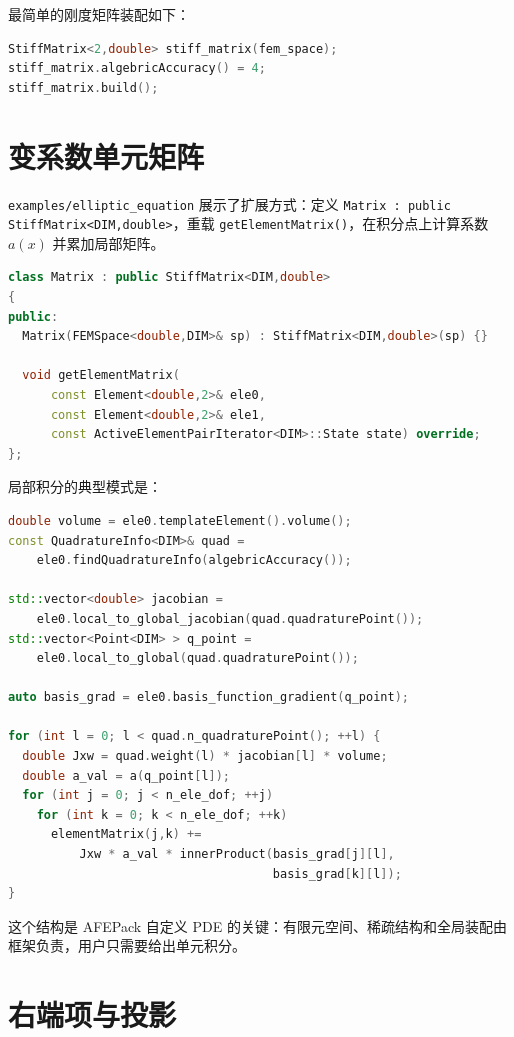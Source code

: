 \documentclass[UTF8,openany,zihao=-4,scheme=chinese]{ctexbook}
\newcommand{\file}[1]{\nolinkurl{#1}}
\newcommand{\class}[1]{\texttt{#1}}
\begin{document}
最简单的刚度矩阵装配如下：

\begin{lstlisting}[language=C++]
StiffMatrix<2,double> stiff_matrix(fem_space);
stiff_matrix.algebricAccuracy() = 4;
stiff_matrix.build();
\end{lstlisting}

\section{变系数单元矩阵}

\file{examples/elliptic_equation} 展示了扩展方式：定义 \class{Matrix : public StiffMatrix<DIM,double>}，重载 \class{getElementMatrix()}，在积分点上计算系数 $a(x)$ 并累加局部矩阵。

\begin{lstlisting}[language=C++]
class Matrix : public StiffMatrix<DIM,double>
{
public:
  Matrix(FEMSpace<double,DIM>& sp) : StiffMatrix<DIM,double>(sp) {}

  void getElementMatrix(
      const Element<double,2>& ele0,
      const Element<double,2>& ele1,
      const ActiveElementPairIterator<DIM>::State state) override;
};
\end{lstlisting}

局部积分的典型模式是：

\begin{lstlisting}[language=C++]
double volume = ele0.templateElement().volume();
const QuadratureInfo<DIM>& quad =
    ele0.findQuadratureInfo(algebricAccuracy());

std::vector<double> jacobian =
    ele0.local_to_global_jacobian(quad.quadraturePoint());
std::vector<Point<DIM> > q_point =
    ele0.local_to_global(quad.quadraturePoint());

auto basis_grad = ele0.basis_function_gradient(q_point);

for (int l = 0; l < quad.n_quadraturePoint(); ++l) {
  double Jxw = quad.weight(l) * jacobian[l] * volume;
  double a_val = a(q_point[l]);
  for (int j = 0; j < n_ele_dof; ++j)
    for (int k = 0; k < n_ele_dof; ++k)
      elementMatrix(j,k) +=
          Jxw * a_val * innerProduct(basis_grad[j][l],
                                     basis_grad[k][l]);
}
\end{lstlisting}

这个结构是 AFEPack 自定义 PDE 的关键：有限元空间、稀疏结构和全局装配由框架负责，用户只需要给出单元积分。

\section{右端项与投影}
\end{document}
